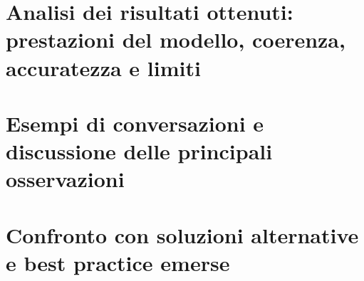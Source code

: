 \section{Analisi dei risultati ottenuti: prestazioni del modello, coerenza, accuratezza e limiti}
\section{Esempi di conversazioni e discussione delle principali osservazioni}
\section{Confronto con soluzioni alternative e best practice emerse}